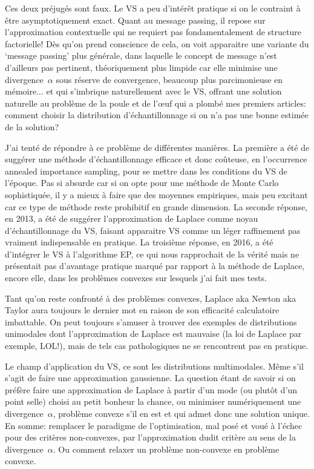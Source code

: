 \documentclass{article}
\begin{document}
Ces deux pr\'ejug\'es sont faux. Le VS a peu d'int\'er\^et pratique si on le contraint \`a \^etre asymptotiquement exact. Quant au message passing, il repose sur l'approximation contextuelle qui ne requiert pas fondamentalement de structure factorielle! D\`es qu'on prend conscience de cela, on voit apparaitre une variante du `message passing' plus g\'en\'erale, dans laquelle le concept de message n'est d'ailleurs pas pertinent, th\'eoriquement plus limpide car elle minimise une divergence~$\alpha$ sous r\'eserve de convergence, beaucoup plus parcimonieuse en m\'emoire... et qui s'imbrique naturellement avec le VS, offrant une solution naturelle au probl\`eme de la poule et de l'\oe uf qui a plomb\'e mes premiers articles: comment choisir la distribution d'\'echantillonnage si on n'a pas une bonne estim\'ee de la solution?

J'ai tent\'e de r\'epondre \`a ce probl\`eme de diff\'erentes mani\`eres. La premi\`ere a \'et\'e de sugg\'erer une m\'ethode d'\'echantillonnage efficace et donc co\^uteuse, en l'occurrence annealed importance sampling, pour se mettre dans les conditions du VS de l'\'epoque. Pas si absurde car si on opte pour une m\'ethode de Monte Carlo sophistiqu\'ee, il y a mieux \`a faire que des moyennes empiriques, mais peu excitant car ce type de m\'ethode reste prohibitif en grande dimension. La seconde r\'eponse, en 2013, a \'et\'e de sugg\'erer l'approximation de Laplace comme noyau d'\'echantillonnage du VS, faisant apparaitre VS comme un l\'eger raffinement pas vraiment indispensable en pratique. La troisi\`eme r\'eponse, en 2016, a \'et\'e d'int\'egrer le VS \`a l'algorithme EP, ce qui nous rapprochait de la v\'erit\'e mais ne pr\'esentait pas d'avantage pratique marqu\'e par rapport \`a la m\'ethode de Laplace, encore elle, dans les probl\`emes convexes sur lesquels j'ai fait mes tests. 

Tant qu'on reste confront\'e \`a des probl\`emes convexes, Laplace aka Newton aka Taylor aura toujours le dernier mot en raison de son efficacit\'e calculatoire imbattable. On peut toujours s'amuser \`a trouver des exemples de distributions unimodales dont l'approximation de Laplace est mauvaise (la loi de Laplace par exemple, LOL!), mais de tels cas pathologiques ne se rencontrent pas en pratique. 

Le champ d'application du VS, ce sont les distributions multimodales. M\^eme s'il s'agit de faire une approximation gaussienne. La question \'etant de savoir si on pr\'ef\`ere faire une approximation de Laplace \`a partir d'un mode (ou plut\^ot d'un point selle) choisi au petit bonheur la chance, ou minimiser num\'eriquement une divergence~$\alpha$, probl\`eme convexe s'il en est et qui admet donc une solution unique. En somme: remplacer le paradigme de l'optimisation, mal pos\'e et vou\'e \`a l'\'echec pour des crit\`eres non-convexes, par l'approximation dudit crit\`ere au sens de la divergence~$\alpha$. Ou comment relaxer un probl\`eme non-convexe en probl\`eme convexe.
\end{document}
